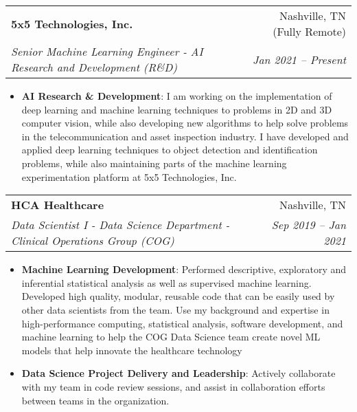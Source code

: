 \documentclass[letterpaper,11pt]{article}
\makeatletter
\newcommand{\resumeItem}[2]{
  \item\small{
    \textbf{#1}{: #2 \vspace{-2pt}}
  }
}
\newcommand{\resumeSubheading}[4]{
  \vspace{-1pt}\item
    \begin{tabular*}{0.97\textwidth}{l@{\extracolsep{\fill}}r}
      \textbf{#1} & #2 \\
      \textit{\small#3} & \textit{\small #4} \\
    \end{tabular*}\vspace{-5pt}
}
\newcommand{\resumeItemListStart}{\begin{itemize}}
\newcommand{\resumeItemListEnd}{\end{itemize}\vspace{-5pt}}
\makeatother
\begin{document}
    \resumeSubheading
        {5x5 Technologies, Inc.}{Nashville, TN (Fully Remote)}
        {Senior Machine Learning Engineer - AI Research and Development (R\&D)}{Jan 2021 -- Present}
        \resumeItemListStart
            \resumeItem{AI Research \& Development}
            {I am working on the implementation of deep learning and machine learning techniques to
            problems in 2D and 3D computer vision, while also developing new algorithms to help solve
            problems in the telecommunication and asset inspection industry. I have developed
            and applied deep learning techniques to object detection and identification problems,
            while also maintaining parts of the machine learning experimentation platform
            at 5x5 Technologies, Inc.}
        \resumeItemListEnd

    \resumeSubheading
      {HCA Healthcare}{Nashville, TN}
      {Data Scientist I - Data Science Department - Clinical Operations Group (COG)}{Sep 2019 -- Jan 2021}
      \resumeItemListStart
        \resumeItem{Machine Learning Development}
          {Performed descriptive, exploratory and inferential statistical analysis as well
          as supervised machine learning. Developed high quality, modular, reusable code
          that can be easily used by other data scientists from the team. Use my background
          and expertise in high-performance computing, statistical analysis, software
          development, and machine learning to help the COG Data Science team create novel
          ML models that help innovate the healthcare technology
          }
        \resumeItem{Data Science Project Delivery and Leadership}
          {Actively collaborate with my team in code review sessions, and assist in
          collaboration efforts between teams in the organization.
          }
      \resumeItemListEnd
\end{document}
